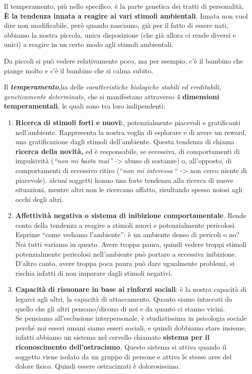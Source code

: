 \documentclass[]{article}
\begin{document}
Il temperamento, più nello specifico, è la parte genetica dei tratti di
personalità. \textbf{È la tendenza innata a reagire ai vari stimoli
ambientali}. Innata non vuol dire non modificabile, però quando
nasciamo, già per il fatto di essere nati, abbiamo la nostra piccola,
unica disposizione (che già allora ci rende diversi e unici) a reagire
in un certo modo agli stimoli ambientali.

Da piccoli si può vedere relativamente poco, ma per esempio, c'è il
bambino che piange molto e c'è il bambino che si calma subito.

Il \textbf{\emph{temperamento}},ha delle \emph{caratteristiche
biologiche stabili ed ereditabili, geneticamente determinate}, che si
manifestano attraverso 4 \textbf{dimensioni temperamentali}, le quali
sono tra loro indipendenti:

\begin{enumerate}
\def\labelenumi{\arabic{enumi}.}
\item
  \textbf{Ricerca di stimoli forti e nuovi:}, potenzialmente piacevoli e
  gratificanti nell'ambiente. Rappresenta la nostra voglia di esplorare
  e di avere un reward, una gratificazione dagli stimoli dell'ambiente.
  Questa tendenza di chiama \textbf{ricerca della novità,} ed è
  responsabile, se eccessiva, di comportamenti di impulsività
  (\emph{``non mi basta mai''} -\textgreater{} abuso di sostanze) o,
  all'opposto, di comportamenti di eccessivo ritiro (``\emph{non mi
  interessa} `` -\textgreater{} non cerco niente di piacevole). alcuni
  soggetti hanno una forte tendenza alla ricerca di nuove situazioni,
  mentre altri non le ricercano affatto, risultando spesso noiosi agli
  occhi degli altri.
\item
  \textbf{Affettività negativa o sistema di inibizione comportamentale}.
  Rende conto della tendenza a reagire a stimoli nuovi e potenzialmente
  pericolosi. Esprime ``come vediamo l'ambiente'': è un ambiente denso
  di pericoli o no? Noi tutti variamo in questo. Avere troppa paura,
  quindi vedere troppi stimoli potenzialmente pericolosi nell'ambiente
  può portare a eccessiva inibizione. D'altro canto, avere troppa poca
  paura può dare ugualmente problemi, si rischia infatti di non imparare
  dagli stimoli negativi.
\item
  \textbf{Capacità di risuonare in base ai rinforzi sociali}: è la
  nostra capacità di legarci agli altri, la capacità di attaccamento.
  Quanto siamo intaccati da quello che gli altri pensano/dicono di noi e
  da quanto ci stanno vicini.\\
  Se pensiamo all'esclusione interpersonale, è studiatissima in
  psicologia sociale perché noi esseri umani siamo esseri sociali, e
  quindi dobbiamo stare insieme, infatti abbiamo un sistema nel cervello
  chiamato \textbf{sistema per il riconoscimento
  dell'ostracismo}\emph{.} Questo sistema si attiva quando il soggetto
  viene isolato da un gruppo di persone e attiva le stesse aree del
  dolore fisico. Quindi essere ostracizzati è dolorosissimo.
\end{enumerate}
\end{document}
